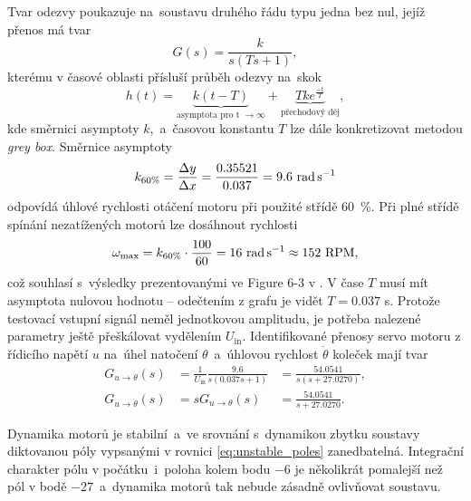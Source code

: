 \documentclass[conference]{IEEEtran}
\begin{document}
Tvar odezvy poukazuje na~soustavu druhého řádu typu jedna bez nul, jejíž přenos má tvar
\begin{equation}
    G(s) = \frac{k}{s(Ts+1)},
    \label{eq:servo_prenos}
\end{equation}
kterému v časové oblasti přísluší průběh odezvy na~skok
\begin{equation}
    h(t) = \underbrace{k(t-T)}_{\text{asymptota pro t $\to \infty$}} + \underbrace{Tk e^{\frac{-t}{T}}}_{\text{přechodový děj}},
    \label{eq:servo_odezva}
\end{equation}
kde směrnici asymptoty $k$,~a~časovou konstantu $T$ lze dále konkretizovat metodou \textit{grey box}.
Směrnice asymptoty
\begin{equation}
    k_{60\%} = \frac{\Delta y}{\Delta x} = \frac{0.35521}{0.037} = 9.6~\text{\si{\radian\per\second}}
\end{equation}
odpovídá úhlové rychlosti otáčení motoru při použité střídě $60$~\%. Při plné střídě spínání nezatížených motorů lze dosáhnout rychlosti
\begin{equation}
    \omega_\text{max} = k_{60\%} \cdot \frac{100}{60} = 16~\text{\si{\radian\per\second}} \approx 152~\text{RPM},
    \label{eq:max_rpm}
\end{equation}
což souhlasí s~výsledky prezentovanými ve Figure 6-3 v \cite{model_based_design}.
V čase $T$ musí mít asymptota nulovou hodnotu -- odečtením z grafu je vidět $T = 0.037$ \si{\second}.
Protože testovací vstupní signál neměl jednotkovou amplitudu, je potřeba nalezené parametry ještě přeškálovat vydělením $U_\text{in}$. 
Identifikované přenosy servo motoru z řídicího napětí $u$ na~úhel natočení $\theta$~a~úhlovou rychlost $\dot{\theta}$ koleček mají tvar
\begin{equation}
    \begin{aligned}
        G_{u\to\theta}(s) &= \frac{1}{U_\text{in}} \frac{9.6}{s(0.037s + 1)}   &=  \frac{54.0541}{s(s+27.0270)}, \\
        G_{u\to\dot{\theta}}(s) &= sG_{u\to\theta}(s) &= \frac{54.0541}{s+27.0270}.
    \end{aligned}
\end{equation} 

Dynamika motorů je stabilní~a~ve srovnání s~dynamikou zbytku soustavy diktovanou póly vypsanými v rovnici \eqref{eq:unstable_poles} zanedbatelná.
Integrační charakter pólu v počátku~i~poloha kolem bodu $-6$ je několikrát pomalejší než pól v bodě $-27$~a~dynamika motorů tak nebude zásadně ovlivňovat soustavu.
\end{document}
